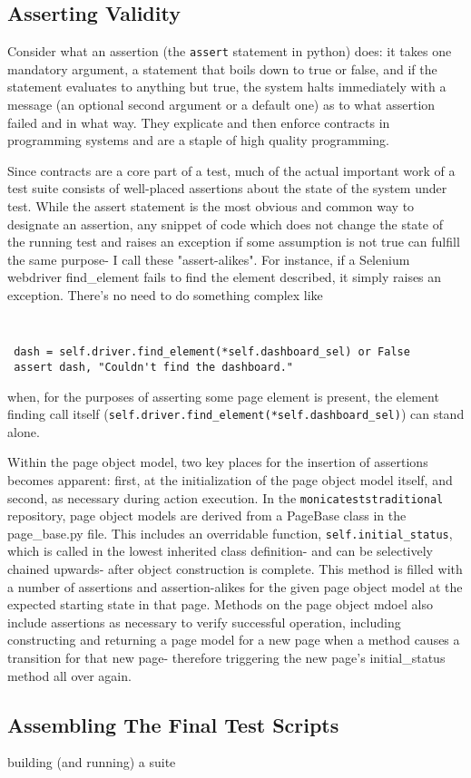 \subsection{Asserting Validity}
Consider what an assertion (the \texttt{assert} statement in python) does: it takes one mandatory argument, a statement that boils down to true or false, and if the statement evaluates to anything but true, the system halts immediately with a message (an optional second argument or a default one) as to what assertion failed and in what way. They explicate and then enforce contracts in programming systems and are a staple of high quality programming.

Since contracts are a core part of a test, much of the actual important work of a test suite consists of well-placed assertions about the state of the system under test. While the assert statement is the most obvious and common way to designate an assertion, any snippet of code which does not change the state of the running test and raises an exception if some assumption is not true can fulfill the same purpose- I call these "assert-alikes". For instance, if a Selenium webdriver find\_element fails to find the element described, it simply raises an exception. There's no need to do something complex like
{\tt
\begin{verbatim}
 dash = self.driver.find_element(*self.dashboard_sel) or False
 assert dash, "Couldn't find the dashboard."
\end{verbatim}
}
when, for the purposes of asserting some page element is present, the element finding call itself (\texttt{self.driver.find\_element(*self.dashboard\_sel)}) can stand alone.

Within the page object model, two key places for the insertion of assertions becomes apparent: first, at the initialization of the page object model itself, and second, as necessary during action execution. In the \texttt{monica\-tests\-traditional} repository, page object models are derived from a PageBase class in the page\_base.py file. This includes an overridable function, \texttt{self.initial\_status}, which is called in the lowest inherited class definition- and can be selectively chained upwards- after object construction is complete. This method is filled with a number of assertions and assertion-alikes for the given page object model at the expected starting state in that page. Methods on the page object mdoel also include assertions as necessary to verify successful operation, including constructing and returning a page model for a new page when a method causes a transition for that new page- therefore triggering the new page's initial\_status method all over again.

\subsection{Assembling The Final Test Scripts}
building (and running) a suite %
